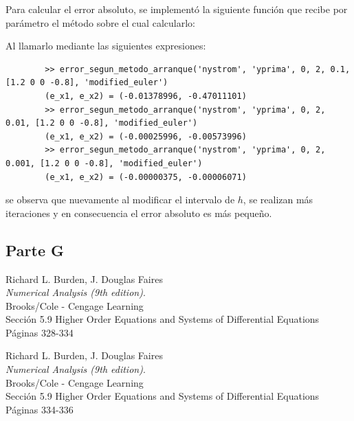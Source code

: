 \documentclass[titlepage,a4paper]{article}
\begin{document}
	Para calcular el error absoluto, se implementó la siguiente función que recibe por parámetro el método sobre el cual calcularlo:
	

	Al llamarlo mediante las siguientes expresiones:

	\begin{lstlisting}
		>> error_segun_metodo_arranque('nystrom', 'yprima', 0, 2, 0.1, [1.2 0 0 -0.8], 'modified_euler')
		(e_x1, e_x2) = (-0.01378996, -0.47011101)
		>> error_segun_metodo_arranque('nystrom', 'yprima', 0, 2, 0.01, [1.2 0 0 -0.8], 'modified_euler')
		(e_x1, e_x2) = (-0.00025996, -0.00573996)
		>> error_segun_metodo_arranque('nystrom', 'yprima', 0, 2, 0.001, [1.2 0 0 -0.8], 'modified_euler')
		(e_x1, e_x2) = (-0.00000375, -0.00006071)
	\end{lstlisting}

	se observa que nuevamente al modificar el intervalo de $ h $, se realizan más iteraciones y en consecuencia el error absoluto es más pequeño.

	\subsection{Parte G}\label{sec:parteG}

\begin{thebibliography}{9} 
		Richard L. Burden, J. Douglas Faires\\
		\textit{Numerical Analysis (9th edition)}. \\
		Brooks/Cole - Cengage Learning\\
		Sección 5.9 Higher Order Equations and Systems of Differential Equations\\
		Páginas 328-334

		Richard L. Burden, J. Douglas Faires\\
		\textit{Numerical Analysis (9th edition)}.\\ 
		Brooks/Cole - Cengage Learning\\
		Sección 5.9 Higher Order Equations and Systems of Differential Equations\\
		Páginas 334-336
	 
\end{thebibliography}
\end{document}
